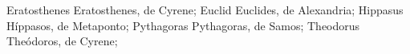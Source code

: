 \DefFriend Eratosthenes     Eratosthenes, de Cyrene; %
\DefFriend Euclid           Euclides, de Alexandria;
\DefFriend Hippasus         Híppasos, de Metaponto; %
\DefFriend Pythagoras       Pythagoras, de Samos; %
\DefFriend Theodorus        Theódoros, de Cyrene; %
